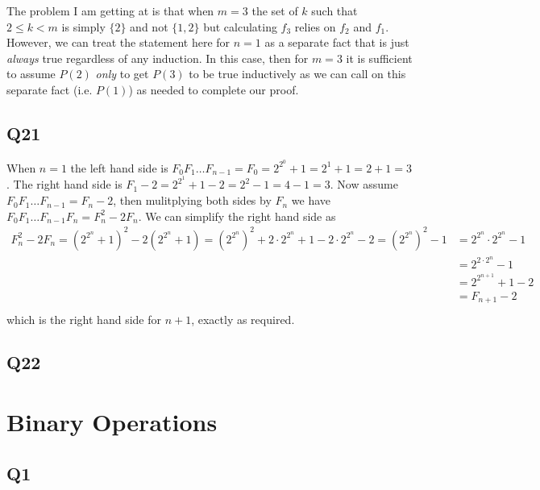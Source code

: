\documentclass[12pt]{article}
\numberwithin{theorem}{section}
\numberwithin{equation}{section}
\numberwithin{remark}{section}
\numberwithin{definition}{section}
\numberwithin{theorem}{section}
\numberwithin{lemma}{section}
\numberwithin{example}{section}
\begin{document}
The problem I am getting at is that when $m=3$ the set of $k$ such that $2\le k < m$ is simply $\{2\}$ and not $\{1,2\}$ but calculating $f_3$ relies on $f_2$ and $f_1$. However, we can treat the statement here for $n=1$ as a separate fact that is just \emph{always} true regardless of any induction. In this case, then for $m=3$ it is sufficient to assume $P(2)$ \emph{only} to get $P(3)$ to be true inductively as we can call on this separate fact (i.e. $P(1)$) as needed to complete our proof. 



\subsection{Q21}

When $n=1$ the left hand side is $F_0F_1\ldots F_{n-1}=F_0=2^{2^0}+1=2^1+1=2+1=3$. The right hand side is $F_1 - 2 = 2^{2^{1}}+1-2=2^2-1=4-1=3$. Now assume $F_0F_1\ldots F_{n-1}=F_n-2$, then mulitplying both sides by $F_n$ we have $F_0F_1\ldots F_{n-1}F_n=F_n^2-2F_n$. We can simplify the right hand side as 
\begin{align*}
	F_n^2-2F_n = \left(2^{2^n}+1\right)^2-2\left(2^{2^n}+1\right)=\left(2^{2^n}\right)^2+2\cdot 2^{2^n}+1-2\cdot 2^{2^n} - 2 = \left(2^{2^n}\right)^2-1 & = 2^{2^n}\cdot 2^{2^n}-1\\
	& = 2^{2\cdot2^n}-1\\
	& = 2^{2^{n+1}}+1-2\\
	& = F_{n+1}-2\\
\end{align*}
which is the right hand side for $n+1$, exactly as required. 



\subsection{Q22}



\newpage

\section{Binary Operations}

\subsection{Q1}
\end{document}
